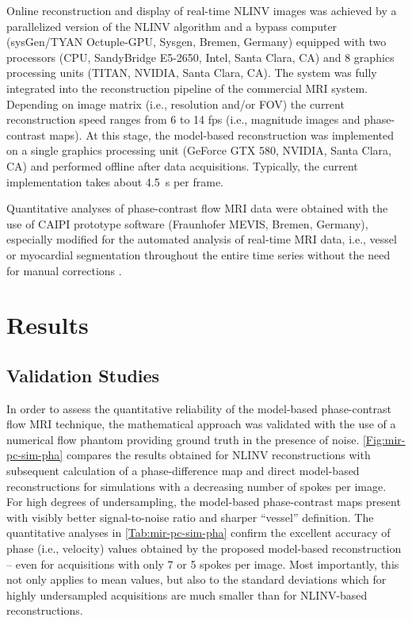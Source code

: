 Online reconstruction and display of real-time NLINV images was achieved by a parallelized version of the NLINV algorithm \cite{2012_Schaetz} and a bypass computer (sysGen/TYAN Octuple-\acs{GPU}, Sysgen, Bremen, Germany) equipped with two processors (CPU, SandyBridge E5-2650, Intel, Santa Clara, CA) and \num{8} graphics processing units (TITAN, NVIDIA, Santa Clara, CA). The system was fully integrated into the reconstruction pipeline of the commercial MRI system. Depending on image matrix (i.e., resolution and/or FOV) the current reconstruction speed ranges from \num{6} to \num{14} fps (i.e., magnitude images and phase-contrast maps). At this stage, the model-based reconstruction was implemented on a single graphics processing unit (GeForce GTX 580, NVIDIA, Santa Clara, CA) and performed offline after data acquisitions. Typically, the current implementation takes about \SI{4.5}{\second} per frame.

Quantitative analyses of phase-contrast flow MRI data were obtained with the use of CAIPI prototype software (Fraunhofer MEVIS, Bremen, Germany), especially modified for the automated analysis of real-time MRI data, i.e., vessel or myocardial segmentation throughout the entire time series without the need for manual corrections \cite{2014_img_segment}.

\clearpage


\section{Results}
\subsection{Validation Studies}
In order to assess the quantitative reliability of the model-based phase-contrast flow MRI technique, the mathematical approach was validated with the use of a numerical flow phantom providing ground truth in the presence of noise. \cref{Fig:mir-pc-sim-pha} compares the results obtained for NLINV reconstructions with subsequent calculation of a phase-difference map and direct model-based reconstructions for simulations with a decreasing number of spokes per image. For high degrees of undersampling, the model-based phase-contrast maps present with visibly better signal-to-noise ratio and sharper “vessel” definition. The quantitative analyses in \cref{Tab:mir-pc-sim-pha} confirm the excellent accuracy of phase (i.e., velocity) values obtained by the proposed model-based reconstruction – even for acquisitions with only \num{7} or \num{5} spokes per image. Most importantly, this not only applies to mean values, but also to the standard deviations which for highly undersampled acquisitions are much smaller than for NLINV-based reconstructions.

